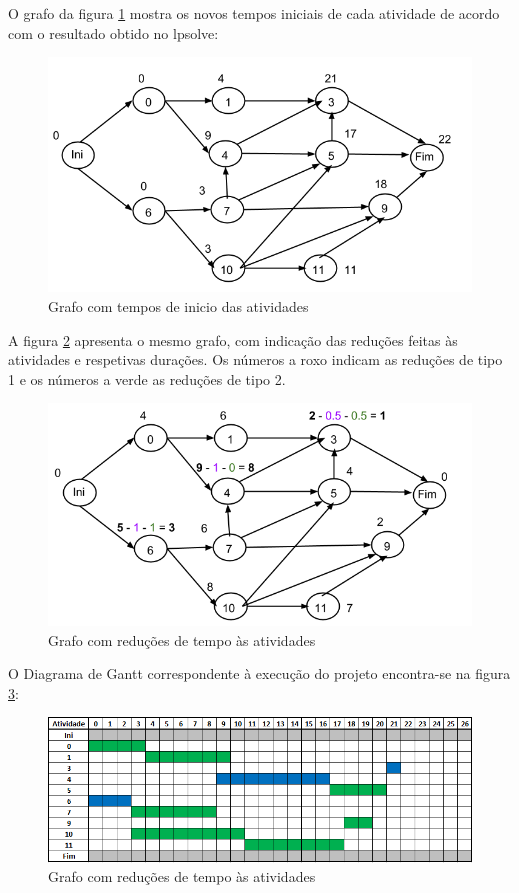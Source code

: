 O grafo da figura \ref{p5:fig:tempos_inicio} mostra os novos tempos iniciais de cada atividade de acordo com o resultado obtido no lpsolve:

\begin{figure}[<+htpb+>]
	\centering
	\includegraphics[scale=0.5]{./img/p5_tempos_inicio}
	\caption{Grafo com tempos de inicio das atividades}
	\label{p5:fig:tempos_inicio}
\end{figure}

A figura \ref{p5:fig:reducoes} apresenta o mesmo grafo, com indicação das reduções feitas às atividades e respetivas durações. Os números a roxo indicam as reduções de tipo 1 e os números a verde as reduções de tipo 2.

\begin{figure}[<+htpb+>]
	\centering
	\includegraphics[scale=0.5]{./img/p5_reducoes}
	\caption{Grafo com reduções de tempo às atividades}
	\label{p5:fig:reducoes}
\end{figure}

O Diagrama de Gantt correspondente à execução do projeto encontra-se na figura \ref{p5:fig:diagrama_gantt}:

\begin{figure}[<+htpb+>]
	\centering
	\includegraphics[scale=0.5]{./img/p5_diagrama_gantt}
	\caption{Grafo com reduções de tempo às atividades}
	\label{p5:fig:diagrama_gantt}
\end{figure}

